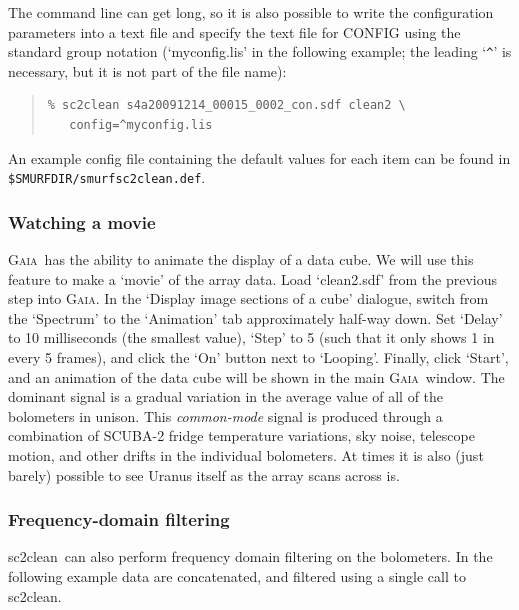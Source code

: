 \documentclass[twoside,11pt]{article}
\newcommand{\xref}[3]{#1}
\newcommand{\xlabel}[1]{}
\renewcommand{\_}{\texttt{\symbol{95}}}
\newenvironment{myquote}{\begin{quote}\begin{small}}{\end{small}\end{quote}}
\newcommand{\gaia}{\xref{\textsc{Gaia}}{sun214}{}}
\newcommand{\task}[1]{\textsf{#1}}
\newcommand{\clean}{\xref{\task{sc2clean}}{sun258}{SC2CLEAN}}
\begin{document}
The command line can get long, so it is also possible to write the
configuration parameters into a text file and specify the text file
for CONFIG using the standard group notation (`myconfig.lis' in the
following example; the leading `\verb|^|' is necessary, but it is not
part of the file name):

\begin{myquote}
\begin{verbatim}
% sc2clean s4a20091214_00015_0002_con.sdf clean2 \
   config=^myconfig.lis
\end{verbatim}
\end{myquote}

An example config file containing the default values for each item
can be found in \\ \texttt{\${SMURF\_DIR}/smurf\_sc2clean.def}.

\subsubsection{\xlabel{movie}Watching a movie}

\gaia\ has the ability to animate the display of a data cube. We will
use this feature to make a `movie' of the array data. Load
`clean2.sdf' from the previous step into \gaia. In the `Display image
sections of a cube' dialogue, switch from the `Spectrum' to the
`Animation' tab approximately half-way down.  Set `Delay' to 10
milliseconds (the smallest value), `Step' to 5 (such that it only
shows 1 in every 5 frames), and click the `On' button next to
`Looping'. Finally, click `Start', and an animation of the data cube
will be shown in the main \gaia\ window. The dominant signal is a
gradual variation in the average value of all of the bolometers in
unison. This {\em common-mode} signal is produced through a
combination of SCUBA-2 fridge temperature variations, sky noise,
telescope motion, and other drifts in the individual bolometers. At
times it is also (just barely) possible to see Uranus itself as the
array scans across is.

\subsubsection{\xlabel{fftfilter}Frequency-domain filtering}

\clean\ can also perform frequency domain filtering on the
bolometers. In the following example data are concatenated, and
filtered using a single call to \clean.
\end{document}

